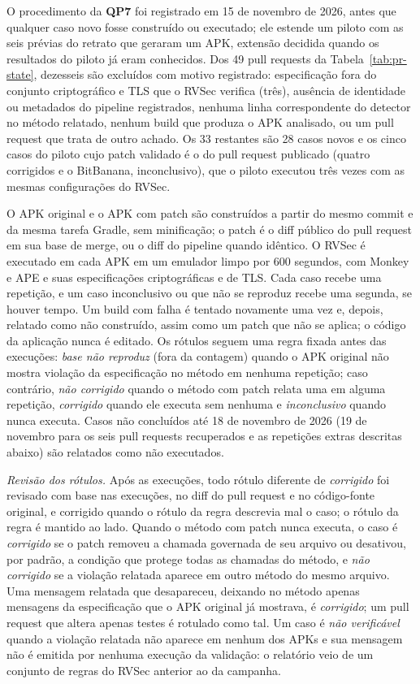 \documentclass[conference]{IEEEtran}
\newcommand{\researchq}[1]{\textbf{QP#1}}
\begin{document}
O procedimento da \researchq{7} foi registrado em 15 de novembro de 2026, antes que qualquer
caso novo fosse construído ou executado; ele estende um piloto com as seis prévias do retrato que geraram um APK, extensão
decidida quando os resultados do piloto já eram conhecidos. Dos 49 pull requests da
Tabela~\ref{tab:pr-state}, dezesseis são excluídos com motivo registrado:
especificação fora do conjunto criptográfico e TLS que o RVSec verifica (três), ausência de
identidade ou metadados do pipeline registrados, nenhuma linha correspondente do detector no
método relatado, nenhum build que produza o APK analisado, ou um pull request
que trata de outro achado. Os 33 restantes são 28 casos novos e os cinco
casos do piloto cujo patch validado é o do pull request publicado (quatro
corrigidos e o BitBanana, inconclusivo), que o piloto executou três vezes com
as mesmas configurações do RVSec.

O APK original e o APK com patch são construídos a partir do mesmo commit e da mesma tarefa Gradle,
sem minificação; o patch é o diff público do pull request em sua
base de merge, ou o diff do pipeline quando idêntico. O RVSec é executado em cada APK em um
emulador limpo por 600 segundos, com Monkey e APE e suas especificações criptográficas e
de TLS. Cada caso recebe uma repetição, e um caso inconclusivo ou
que não se reproduz recebe uma segunda, se houver tempo. Um build com falha é tentado novamente
uma vez e, depois, relatado como não construído, assim como um patch que não se aplica; o
código da aplicação nunca é editado. Os rótulos seguem uma regra fixada antes das
execuções: \emph{base não reproduz} (fora da contagem) quando o APK original
não mostra violação da especificação no método em nenhuma repetição;
caso contrário, \emph{não corrigido} quando o método com patch relata uma em alguma
repetição, \emph{corrigido} quando ele executa sem nenhuma e
\emph{inconclusivo} quando nunca executa. Casos não concluídos até 18 de
novembro de 2026 (19 de novembro para os seis pull requests recuperados e as
repetições extras descritas abaixo) são relatados como não executados.

\emph{Revisão dos rótulos.} Após as execuções, todo rótulo diferente de
\emph{corrigido} foi revisado com base nas execuções, no diff do pull request e no
código-fonte original, e corrigido quando o rótulo da regra descrevia mal o caso;
o rótulo da regra é mantido ao lado. Quando o método com patch nunca executa, o
caso é \emph{corrigido} se o patch removeu a chamada governada de seu arquivo ou
desativou, por padrão, a condição que protege todas as chamadas do método, e
\emph{não corrigido} se a violação relatada aparece em outro método do mesmo
arquivo. Uma mensagem relatada que desapareceu, deixando no método apenas
mensagens da especificação que o APK original já mostrava, é \emph{corrigido}; um
pull request que altera apenas testes é rotulado como tal. Um caso é \emph{não
verificável} quando a violação relatada não aparece em nenhum dos APKs e sua
mensagem não é emitida por nenhuma execução da validação: o relatório veio de um
conjunto de regras do RVSec anterior ao da campanha.
\end{document}
